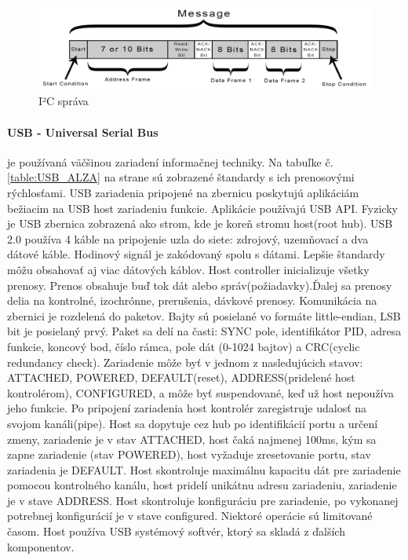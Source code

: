 \documentclass[../../main.tex]{subfiles}
\begin{document}
\begin{figure}[htbp!]
    \centering
  \includegraphics[scale=0.4]{images/I2C-Message-Frame-and-Bit-2.png}
  \caption{I²C správa \cite{i2c_protocol}}
    \label{fig:i2c_message}
\end{figure} 
\paragraph{USB - Universal Serial Bus} je používaná väčšinou zariadení informačnej techniky. Na tabuľke č. \ref{table:USB_ALZA} na strane \pageref{table:USB_ALZA} sú zobrazené štandardy s ich prenosovými rýchlosťami. USB zariadenia pripojené na zbernicu poskytujú aplikáciám bežiacim na USB host zariadeniu funkcie. Aplikácie používajú USB API. Fyzicky je USB zbernica zobrazená ako strom, kde je koreň stromu host(root hub). USB 2.0 používa 4 káble na pripojenie uzla do siete: zdrojový, uzemňovací a dva dátové káble. Hodinový signál je zakódovaný spolu s dátami. Lepšie štandardy môžu obsahovať aj viac dátových káblov. Host controller inicializuje všetky prenosy. Prenos obsahuje buď tok dát alebo správ(požiadavky).Ďalej sa prenosy delia na kontrolné, izochrónne, prerušenia, dávkové prenosy. Komunikácia na zbernici je rozdelená do paketov. Bajty sú posielané vo formáte little-endian, LSB  bit je posielaný prvý. Paket sa delí na časti: SYNC pole, identifikátor PID, adresa funkcie, koncový bod, číslo rámca, pole dát (0-1024 bajtov)
a CRC(cyclic redundancy check). Zariadenie môže byť v jednom z nasledujúcich stavov: ATTACHED, POWERED, DEFAULT(reset), ADDRESS(pridelené host kontrolérom), CONFIGURED, a môže byť suspendované, keď už host nepoužíva jeho funkcie. Po pripojení zariadenia host kontrolér zaregistruje udalosť na svojom kanáli(pipe). Host sa dopytuje cez hub po identifikácií portu a  určení zmeny, zariadenie je v stav ATTACHED, host čaká najmenej 100ms, kým sa zapne zariadenie (stav POWERED), host vyžaduje zresetovanie portu, stav zariadenia je DEFAULT. Host skontroluje maximálnu kapacitu dát pre zariadenie pomocou kontrolného kanálu, host pridelí unikátnu adresu zariadeniu, zariadenie je v stave ADDRESS. Host skontroluje konfiguráciu pre zariadenie, po vykonanej potrebnej konfigurácií je v stave configured. Niektoré operácie sú limitované časom. Host používa USB systémový softvér, ktorý sa skladá z ďalších komponentov. \cite{WOLF201923}
\end{document}
